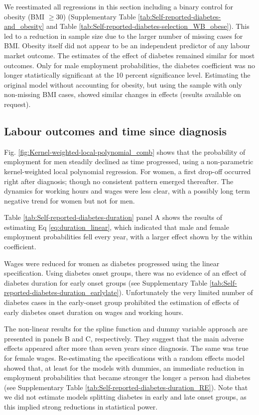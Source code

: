 \documentclass[12pt,english]{article}
\begin{document}
We reestimated all regressions in this section including a binary control for obesity (BMI $\geq 30$) (Supplementary Table \ref{tab:Self-reported-diabetes-and_obesity} and Table \ref{tab:Self-reported-diabetes-selection_WB_obese}). This led to a reduction in sample size due to the larger number of missing cases for BMI. Obesity itself did not appear to be an independent predictor of any labour market outcome. The estimates of the effect of diabetes remained similar for most outcomes. Only for male employment probabilities, the diabetes coefficient was no longer statistically significant at the 10 percent significance level. Estimating the original model without accounting for obesity, but using the sample with only non-missing BMI cases, showed similar changes in effects (results available on request).


\subsection{\label{sec:duration}Labour outcomes and time since diagnosis }

Fig. \ref{fig:Kernel-weighted-local-polynomial_comb} shows that the probability of employment for men steadily declined as time progressed, using a non-parametric kernel-weighted local polynomial regression. For women, a first drop-off occurred right after diagnosis; though no consistent pattern emerged thereafter. The dynamics for working hours and wages were less clear, with a possibly long term negative trend for women but not for men.


Table \ref{tab:Self-reported-diabetes-duration} panel A shows the results of estimating Eq \ref{eq:duration_linear}, which indicated that male and female employment probabilities fell every year, with a larger effect shown by the within coefficient.



Wages were reduced for women as diabetes progressed using the linear specification. Using diabetes onset groups, there was no evidence of an effect of diabetes duration for early onset groups (see Supplementary Table \ref{tab:Self-reported-diabetes-duration_earlylate}). Unfortunately the very limited number of diabetes cases in the early-onset group prohibited the estimation of effects of early diabetes onset duration on wages and working hours.


The non-linear results for the spline function and dummy variable approach are  presented in panels B and C, respectively. They suggest that the main adverse effects appeared after more than seven years since diagnosis. The same was true for female wages. Re-estimating the specifications with a random effects model showed that, at least for the models with dummies, an immediate reduction in employment probabilities that became stronger the longer a person had diabetes (see Supplementary Table \ref{tab:Self-reported-diabetes-duration_RE}). Note that we did not estimate models splitting diabetes in early and late onset groups, as this implied strong reductions in statistical power.
\end{document}
